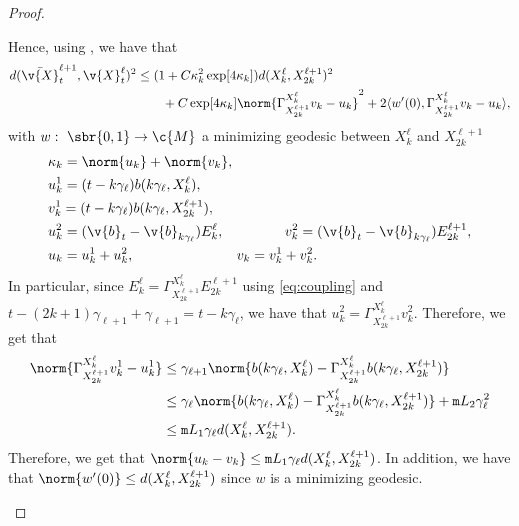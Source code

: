 \begin{proof}{}{}
\begin{enumerate}[wide, labelindent=0pt, label=(\alph*)]
		      Hence, using , we have that \begin{align} \label{eq:upper_bound_distance_cheng_duo} d(\bar{\v{X}}_{t}^{\ell+1}, \v{X}_{t}^\ell)^2 &\leq (1 +C \kappa_k^2 \exp[4 \kappa_k]) d(X_k^\ell,X_{2k}^{\ell+1})^2 \\ & \qquad + C \exp[4 \kappa_k] \norm{\Gamma_{X_{2k}^{\ell+1}}^{X_k^\ell} v_k - u_k}^2 + 2 \langle w'(0), \Gamma_{X_{2k}^{\ell+1}}^{X_k^\ell} v_k - u_k \rangle , \end{align} with $w: \ \sbr{0,1} \to \c{M}$ a minimizing geodesic between $X_k^\ell$ and $X_{2k}^{\ell+1}$ \begin{align}  & \kappa_k = \norm{u_k} + \norm{v_k} , \\ &u_k^1 = (t- k\gamma_\ell) b(k \gamma_\ell, X_k^\ell) , \\ &v_k^1 = (t - k\gamma_{\ell}) b(k \gamma_{\ell }, X_{2k}^{\ell+1}) , \\ &u_k^2 = (\v{b}_{t} - \v{b}_{k \gamma_\ell}) E_{k}^{\ell} , \qquad \quad \quad \ v_k^2 = (\v{b}_{t} - \v{b}_{k \gamma_\ell}) E_{2k}^{\ell+1} , \\ &u_k = u_k^1 + u_k^2 , \qquad \qquad \qquad \quad \ v_k = v_k^1 + v_k^2 .
		      \end{align}
		      In particular, since $E_k^\ell = \Gamma_{X_{2k}^{\ell+1}}^{X_{k}^\ell} E_{2k}^{\ell+1}$ using \eqref{eq:coupling} and $t- (2k+1)\gamma_{\ell+1} + \gamma_{\ell+1} = t - k \gamma_\ell$, we have that $u_k^2 = \Gamma_{X_{2k}^{\ell+1}}^{X_{k}^\ell} v_k^2$.
		      Therefore, we get that \begin{align} \norm{\Gamma_{X_{2k}^{\ell+1}}^{X_{k}^\ell} v_k^1 - u_k^1} & \leq \gamma_{\ell+1} \norm{b(k \gamma_\ell, X_k^\ell) - \Gamma_{X_{2k}^{\ell+1}}^{X_{k}^\ell} b(k \gamma_\ell, X_{2k}^{\ell+1})} \\ &\leq \gamma_{\ell} \norm{b(k \gamma_\ell, X_k^\ell) - \Gamma_{X_{2k}^{\ell+1}}^{X_{k}^\ell} b(k \gamma_\ell, X_{2k}^{\ell+1})} + \mathtt{m}{L}_2 \gamma_{\ell}^2 \\ &\leq \mathtt{m}{L}_1 \gamma_\ell d(X_k^\ell, X_{2k}^{\ell+1}) .
		      \end{align}
		      Therefore, we get that $\norm{u_k - v_k} \leq \mathtt{m}{L}_1 \gamma_\ell d(X_k^\ell, X_{2k}^{\ell+1})$.
		      In addition, we have that $\norm{w'(0)} \leq d(X_k^\ell, X_{2k}^{\ell+1})$ since $w$ is a minimizing geodesic.

\end{enumerate}
\end{proof}
